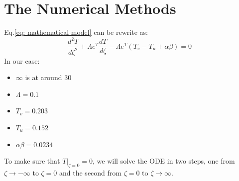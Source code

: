 \documentclass[11pt, a4paper]{article}
\begin{document}
\section{The Numerical Methods}
Eq.\ref{eq: mathematical model} can be rewrite as:
\begin{equation*}
    \displaystyle\frac{d^2T}{d\zeta^2}+\Lambda e^T\frac{dT}{d\zeta}-\Lambda e^T\left(T_v-T_u+\alpha\beta\right)=0
    \label{eq: the ode}
\end{equation*}
In our case:
\begin{itemize}
    \item $\infty$ is at around $30$
    \item $\Lambda=0.1$
    \item $T_v=0.203$
    \item $T_u=0.152$
    \item $\alpha\beta=0.0234$
\end{itemize}
To make sure that $\left.T\right|_{\zeta=0}=0$, we will solve the ODE in two steps, one from $\zeta\rightarrow-\infty$ to $\zeta=0$ and the second from $\zeta=0$ to $\zeta\rightarrow\infty$.
\end{document}
